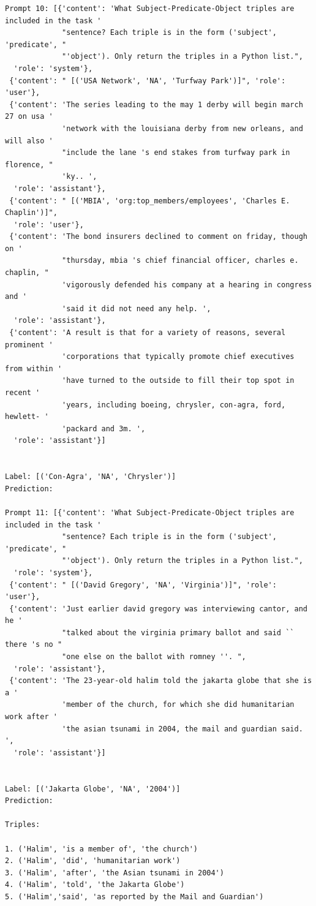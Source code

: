 \documentclass{article}
\begin{document}
\begin{lstlisting}
Prompt 10: [{'content': 'What Subject-Predicate-Object triples are included in the task '
             "sentence? Each triple is in the form ('subject', 'predicate', "
             "'object'). Only return the triples in a Python list.",
  'role': 'system'},
 {'content': " [('USA Network', 'NA', 'Turfway Park')]", 'role': 'user'},
 {'content': 'The series leading to the may 1 derby will begin march 27 on usa '
             'network with the louisiana derby from new orleans, and will also '
             "include the lane 's end stakes from turfway park in florence, "
             'ky.. ',
  'role': 'assistant'},
 {'content': " [('MBIA', 'org:top_members/employees', 'Charles E. Chaplin')]",
  'role': 'user'},
 {'content': 'The bond insurers declined to comment on friday, though on '
             "thursday, mbia 's chief financial officer, charles e. chaplin, "
             'vigorously defended his company at a hearing in congress and '
             'said it did not need any help. ',
  'role': 'assistant'},
 {'content': 'A result is that for a variety of reasons, several prominent '
             'corporations that typically promote chief executives from within '
             'have turned to the outside to fill their top spot in recent '
             'years, including boeing, chrysler, con-agra, ford, hewlett- '
             'packard and 3m. ',
  'role': 'assistant'}]


Label: [('Con-Agra', 'NA', 'Chrysler')]
Prediction: 

Prompt 11: [{'content': 'What Subject-Predicate-Object triples are included in the task '
             "sentence? Each triple is in the form ('subject', 'predicate', "
             "'object'). Only return the triples in a Python list.",
  'role': 'system'},
 {'content': " [('David Gregory', 'NA', 'Virginia')]", 'role': 'user'},
 {'content': 'Just earlier david gregory was interviewing cantor, and he '
             "talked about the virginia primary ballot and said `` there 's no "
             "one else on the ballot with romney ''. ",
  'role': 'assistant'},
 {'content': 'The 23-year-old halim told the jakarta globe that she is a '
             'member of the church, for which she did humanitarian work after '
             'the asian tsunami in 2004, the mail and guardian said. ',
  'role': 'assistant'}]


Label: [('Jakarta Globe', 'NA', '2004')]
Prediction: 

Triples:

1. ('Halim', 'is a member of', 'the church')
2. ('Halim', 'did', 'humanitarian work')
3. ('Halim', 'after', 'the Asian tsunami in 2004')
4. ('Halim', 'told', 'the Jakarta Globe')
5. ('Halim','said', 'as reported by the Mail and Guardian')


\end{lstlisting}
\end{document}
